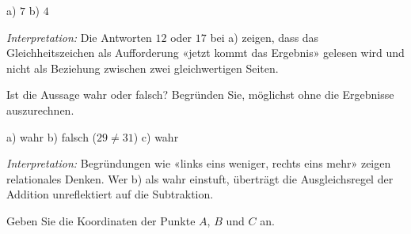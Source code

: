 \documentclass[11pt]{exam}
\newcommand{\aufgabe}[1]{%
  \needspace{8\baselineskip}%
  \renewcommand{\questionlabel}{\textbf{#1}}%
  \question}
\newcommand{\geteilt}{\mathbin{:}}
\newcommand{\kaestchen}{\fbox{\rule{0pt}{1.1em}\hspace{1.6em}}}
\newcommand{\raum}[1]{\ifprintanswers\else\fillwithgrid{#1}\fi}
\newcommand{\wahl}[1]{\mbox{$\Box$\,#1}}
\newcommand{\wahlr}[1]{\mbox{\ifprintanswers$\blacksquare$\,\textbf{#1}\else$\Box$\,#1\fi}}
\newcommand{\diagnose}[1]{\par\smallskip\textit{Interpretation:} #1}
\begin{document}
\begin{questions}
\begin{solution}
  a) $7$ \qquad b) $4$
  \diagnose{Die Antworten $12$ oder $17$ bei a) zeigen, dass das
  Gleichheitszeichen als Aufforderung «jetzt kommt das Ergebnis» gelesen wird
  und nicht als Beziehung zwischen zwei gleichwertigen Seiten.}
\end{solution}

\aufgabe{6.2}
Ist die Aussage wahr oder falsch? Begründen Sie, möglichst ohne die Ergebnisse
auszurechnen.
\begin{solution}
  a) wahr \quad b) falsch ($29 \neq 31$) \quad c) wahr
  \diagnose{Begründungen wie «links eins weniger, rechts eins mehr» zeigen
  relationales Denken. Wer b) als wahr einstuft, überträgt die
  Ausgleichsregel der Addition unreflektiert auf die Subtraktion.}
\end{solution}
\raum{3cm}

\aufgabe{7.1}
Geben Sie die Koordinaten der Punkte $A$, $B$ und $C$ an.


\end{questions}
\end{document}
